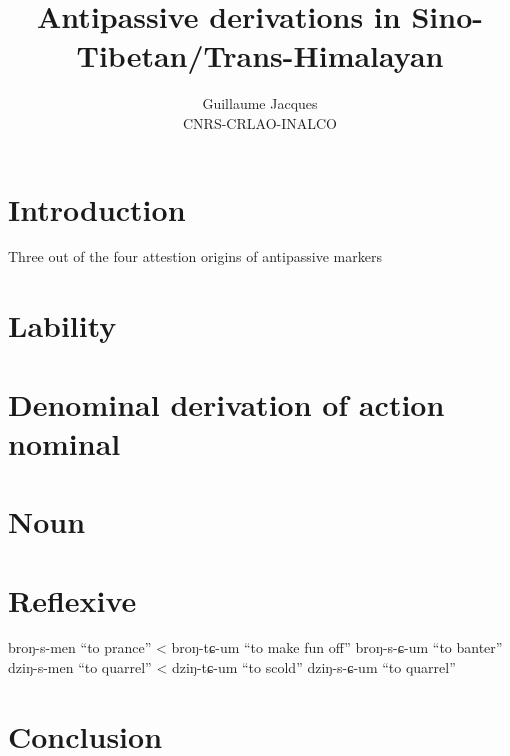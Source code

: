 \documentclass[oneside,a4paper,11pt]{article}
\begin{document}
 
\title{Antipassive derivations in Sino-Tibetan/Trans-Himalayan}
\author{Guillaume Jacques\\ CNRS-CRLAO-INALCO}
\maketitle

\section*{Introduction}

\citet{sanso17antipassive}
Three out of the four attestion origins of antipassive markers

\section{Lability}
\citet{bickel07puma}
\citet{jacques12demotion}

\section{Denominal derivation of action nominal}
\citet{creissels12antip}
\citet{jacques14antipassive}

\section{Noun}

\citet{bickel15antipassive}

\section{Reflexive}
\citet{janic.these}
\citet{jacques16si}

\citet[452;466]{widmer14bunan}
broŋ-s-men “to prance” < broŋ-tɕ-um “to make fun off”
broŋ-s-ɕ-um “to banter”
dziŋ-s-men “to quarrel” < dziŋ-tɕ-um “to scold”
dziŋ-s-ɕ-um “to quarrel”
\section*{Conclusion}




 
\end{document}

